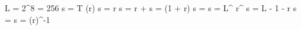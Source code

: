 L = 2^8 = 256
s = T (r)
s =  \times r
s = r + 
s =  \times \log(1 + r)
s = 
s = L^ \times r^
s = L - 1 - r
s = 
s = \exp(r)^-1
